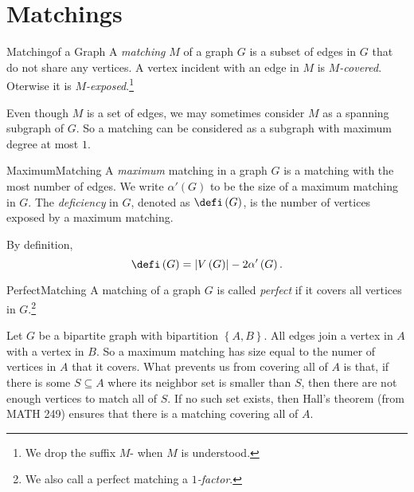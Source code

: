 \documentclass[co342]{subfiles}
\begin{document}

    \section{Matchings}

    \begin{definition}{Matching}{of a Graph}
        A \emph{matching} $M$ of a graph $G$ is a subset of edges in $G$ that do not share any vertices. A vertex incident with an edge in $M$ is \emph{$M$-covered}. Oterwise it is \emph{$M$-exposed}.\footnote{We drop the suffix $M$- when $M$ is understood.}
    \end{definition}
    
    \np Even though $M$ is a set of edges, we may sometimes consider $M$ as a spanning subgraph of $G$. So a matching can be considered as a subgraph with maximum degree at most $1$.

    \begin{definition}{Maximum}{Matching}
        A \emph{maximum} matching in a graph $G$ is a matching with the most number of edges. We write $\alpha'\left( G \right)$ to be the size of a maximum matching in $G$. The \emph{deficiency} in $G$, denoted as $\defi\left( G \right)$, is the number of vertices exposed by a maximum matching.
    \end{definition}

    \np By definition,
    \begin{equation*}
        \defi\left( G \right) = \left| V\left( G \right) \right|-2\alpha'\left( G \right).
    \end{equation*}

    \begin{definition}{Perfect}{Matching}
        A matching of a graph $G$ is called \emph{perfect} if it covers all vertices in $G$.\footnote{We also call a perfect matching a \emph{$1$-factor}.}
    \end{definition}

    \np Let $G$ be a bipartite graph with bipartition $\left\lbrace A,B \right\rbrace$. All edges join a vertex in $A$ with a vertex in $B$. So a maximum matching has size equal to the numer of vertices in $A$ that it covers. What prevents us from covering all of $A$ is that, if there is some $S\subseteq A$ where its neighbor set is smaller than $S$, then there are not enough vertices to match all of $S$. If no such set exists, then Hall's theorem (from MATH 249) ensures that there is a matching covering all of $A$.
\end{document}

